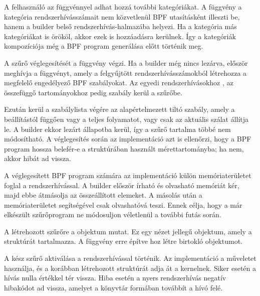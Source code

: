 A felhasználó az  függvénnyel adhat hozzá további kategóriákat. A
függvény a kategória rendszerhívásszámait nem közvetlenül BPF utasításként
illeszti be, hanem a builder belső rendszerhívás-halmazába helyezi. Ha a
kategória más kategóriákat is örököl, akkor ezek is hozzáadásra kerülnek. Így a
kategóriák kompozíciója még a BPF program generálása előtt történik meg.

A szűrő véglegesítését a  függvény végzi. Ha a builder
még nincs lezárva, először meghívja a
 függvényt, amely a
felgyűjtött rendszerhívásszámokból létrehozza a megfelelő engedélyező BPF
szabályokat. Az egyedi rendszerhívásokhoz , az
összefüggő tartományokhoz pedig 
szabály kerül a szűrőbe.

Ezután kerül a szabálylista végére az alapértelmezett tiltó szabály, amely a
beállítástól függően vagy a teljes folyamatot, vagy csak az aktuális szálat
állítja le. A builder ekkor lezárt állapotba kerül, így a szűrő tartalma többé
nem módosítható. A véglegesítés során az implementáció azt is ellenőrzi, hogy a
BPF program hossza belefér-e a  struktúrában használt
 mérettartományba; ha nem, akkor  hibát ad vissza.

A véglegesített BPF program számára az implementáció külön memóriaterületet
foglal a  rendszerhívással. A builder először írható és olvasható
memóriát kér, majd ebbe átmásolja az összeállított 
elemeket. A másolás után a memóriaterületet  segítségével csak
olvashatóvá teszi. Ennek célja, hogy a már elkészült szűrőprogram ne módosuljon
véletlenül a további futás során.

A létrehozott szűrőre a  objektum mutat. Ez egy nézet
jellegű objektum, amely a  struktúrát tartalmazza. A
 függvény erre építve hoz létre birtokló  objektumot.

A kész szűrő aktiválása a  rendszerhívással történik. Az
implementáció a
műveletet használja, és a korábban létrehozott 
struktúrát adja át a kernelnek. Siker esetén a hívás nulla értékkel tér vissza.
Hiba esetén a nyers rendszerhívás negatív hibakódot ad vissza, amelyet a
könyvtár  formában továbbít a hívó felé.


